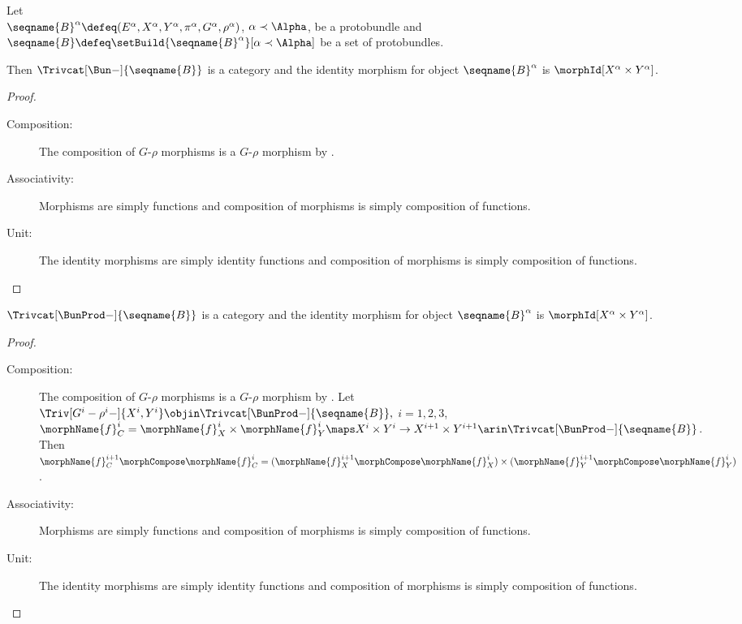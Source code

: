 \documentclass{article}
\begin{document}
\begin{lemma}
\label{lem:Grhomodtrivcat}
Let \\
$
  \seqname{B}^\alpha \defeq
  (E^\alpha, X^\alpha, Y^\alpha, \pi^\alpha, G^\alpha, \rho^\alpha)
$,
$\alpha \prec \Alpha$, be a protobundle and
$\seqname{B} \defeq \setBuild{{\seqname{B}^\alpha}}[\alpha \prec \Alpha]$
be a set of protobundles.

Then $\Trivcat[\Bun-]{\seqname{B}}$ is a category and the identity
morphism for object $\seqname{B}^\alpha$ is
$\morphId[X^\alpha \times Y^\alpha]$.

\begin{proof}
\leavevmode
\begin{description}
\item[Composition:]
The composition of $G$-$\rho$ morphisms is a $G$-$\rho$ morphism by
.
\item[Associativity:]
Morphisms are simply functions and composition of morphisms is simply
composition of functions.
\item[Unit:]
The identity morphisms are simply identity functions and composition of
morphisms is simply composition of functions.
\end{description}
\end{proof}

$\Trivcat[\BunProd-]{\seqname{B}}$ is a category and the identity
morphism for object $\seqname{B}^\alpha$ is
$\morphId[X^\alpha \times Y^\alpha]$.

\begin{proof}
\leavevmode
\begin{description}
\item[Composition:]
The composition of $G$-$\rho$ morphisms is a $G$-$\rho$ morphism by
. Let
$\Triv[G^i-\rho^i-]{X^i,Y^i} \objin\Trivcat[\BunProd-]{\seqname{B}},$
$i=1,2,3$,
$
  \morphName{f}^i_C =
  \morphName{f}^i_X \times \morphName{f}^i_Y \maps
  X^i \times Y^i \to X^{i+1} \times Y^{i+1}
  \arin  \Trivcat[\BunProd-]{\seqname{B}}
$.
Then
$
  \morphName{f}^{i+1}_C \morphCompose \morphName{f}^i_C =
  (\morphName{f}^{i+1}_X \morphCompose \morphName{f}^i_X)
  \times
  (\morphName{f}^{i+1}_Y \morphCompose \morphName{f}^i_Y)
$.

\item[Associativity:]
Morphisms are simply functions and composition of morphisms is simply
composition of functions.

\item[Unit:]
The identity morphisms are simply identity functions and composition of
morphisms is simply composition of functions.
\end{description}
\end{proof}
\end{lemma}
\end{document}
